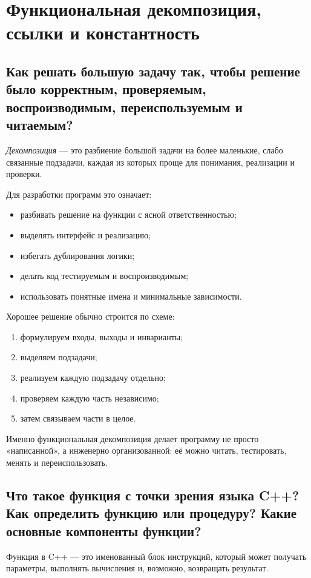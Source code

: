 \section{Функциональная декомпозиция, ссылки и константность}

\subsection{Как решать большую задачу так, чтобы решение было корректным, проверяемым, воспроизводимым, переиспользуемым и читаемым?}
\begin{definition}[Декомпозиция]
\textit{Декомпозиция} — это разбиение большой задачи на более маленькие, слабо связанные подзадачи, каждая из которых проще для понимания, реализации и проверки.
\end{definition}

Для разработки программ это означает:
\begin{itemize}
    \item разбивать решение на функции с ясной ответственностью;
    \item выделять интерфейс и реализацию;
    \item избегать дублирования логики;
    \item делать код тестируемым и воспроизводимым;
    \item использовать понятные имена и минимальные зависимости.
\end{itemize}

Хорошее решение обычно строится по схеме:
\begin{enumerate}
    \item формулируем входы, выходы и инварианты;
    \item выделяем подзадачи;
    \item реализуем каждую подзадачу отдельно;
    \item проверяем каждую часть независимо;
    \item затем связываем части в целое.
\end{enumerate}

\begin{remark}
Именно функциональная декомпозиция делает программу не просто «написанной», а инженерно организованной: её можно читать, тестировать, менять и переиспользовать.
\end{remark}

\subsection{Что такое функция с точки зрения языка C++? Как определить функцию или процедуру? Какие основные компоненты функции?}
\begin{definition}[Функция]
Функция в C++ — это именованный блок инструкций, который может получать параметры, выполнять вычисления и, возможно, возвращать результат.
\end{definition}

